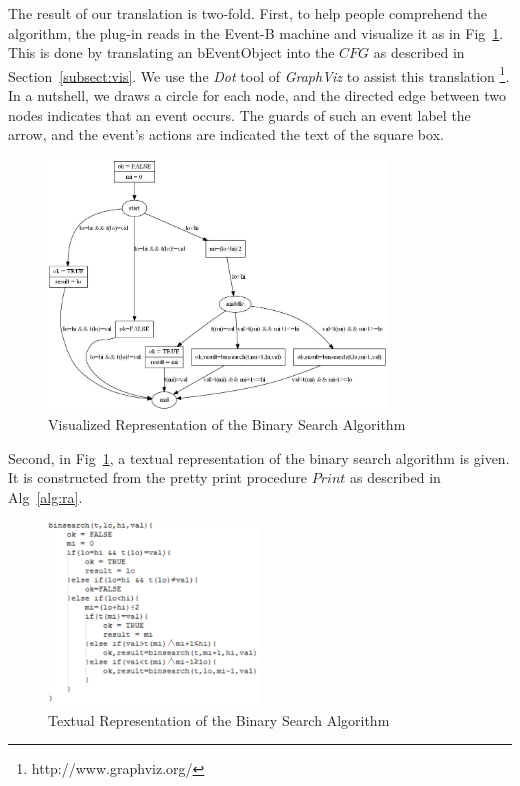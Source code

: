 \documentclass{easychair}
\begin{document}
The result of our translation is two-fold. First, to help people comprehend the algorithm, the plug-in reads in the Event-B machine and visualize it as in Fig~\ref{fig:pix}. This is done by translating an bEventObject into the $CFG$ as described in Section~\ref{subsect:vis}. We use the \textit{Dot} tool of \textit{GraphViz} to assist this translation \footnote{http://www.graphviz.org/}. In a nutshell, we draws a circle for each node, and the directed edge between two nodes indicates that an event occurs. The guards of such an event label the arrow, and the event's actions are indicated the text of the square box. 

\begin{figure}[!h]
  \centering
    \includegraphics[width=0.8\textwidth]{img/pix.jpg}
  \caption{Visualized Representation of the Binary Search Algorithm}
  \label{fig:pix}
\end{figure}

Second, in Fig~\ref{fig:pix}, a textual representation of the binary search algorithm is given. It is constructed from the pretty print procedure $Print$ as described in Alg~\ref{alg:ra}.
\begin{figure}[!h]
  \centering
    \includegraphics[width=0.5\textwidth]{img/alg.jpg}
  \caption{Textual Representation of the Binary Search Algorithm}
  \label{fig:alg}
\end{figure}
\newpage



\end{document}
